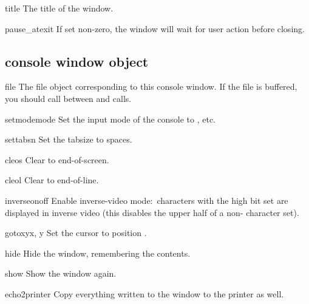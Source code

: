 \begin{datadesc}{title}
The title of the window.
\end{datadesc}

\begin{datadesc}{pause_atexit}
If set non-zero, the window will wait for user action before closing.
\end{datadesc}

\subsection{console window object}


\begin{datadesc}{file}
The file object corresponding to this console window. If the file is
buffered, you should call  between
 and  calls.
\end{datadesc}


\begin{funcdesc}{setmode}{mode}
Set the input mode of the console to , etc.
\end{funcdesc}

\begin{funcdesc}{settabs}{n}
Set the tabsize to  spaces.
\end{funcdesc}

\begin{funcdesc}{cleos}{}
Clear to end-of-screen.
\end{funcdesc}

\begin{funcdesc}{cleol}{}
Clear to end-of-line.
\end{funcdesc}

\begin{funcdesc}{inverse}{onoff}
Enable inverse-video mode:\ characters with the high bit set are
displayed in inverse video (this disables the upper half of a
non-\ASCII{} character set).
\end{funcdesc}

\begin{funcdesc}{gotoxy}{x, y}
Set the cursor to position .
\end{funcdesc}

\begin{funcdesc}{hide}{}
Hide the window, remembering the contents.
\end{funcdesc}

\begin{funcdesc}{show}{}
Show the window again.
\end{funcdesc}

\begin{funcdesc}{echo2printer}{}
Copy everything written to the window to the printer as well.
\end{funcdesc}
